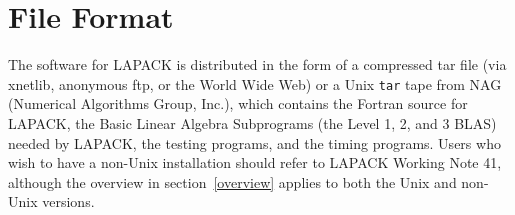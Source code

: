 
\section{File Format}\label{fileformat}

\dent
The software for LAPACK is distributed in the form of a
compressed tar file (via xnetlib, anonymous ftp, or the World Wide Web)
or a Unix {\tt tar} tape from NAG (Numerical Algorithms Group, Inc.),
which contains the Fortran source for LAPACK,
the Basic Linear Algebra Subprograms
(the Level 1, 2, and 3 BLAS) needed by LAPACK, the testing programs,
and the timing programs.
Users who wish to have a non-Unix installation should refer to LAPACK
Working Note 41,
although the overview in section~\ref{overview} applies to both the Unix and non-Unix
versions.

